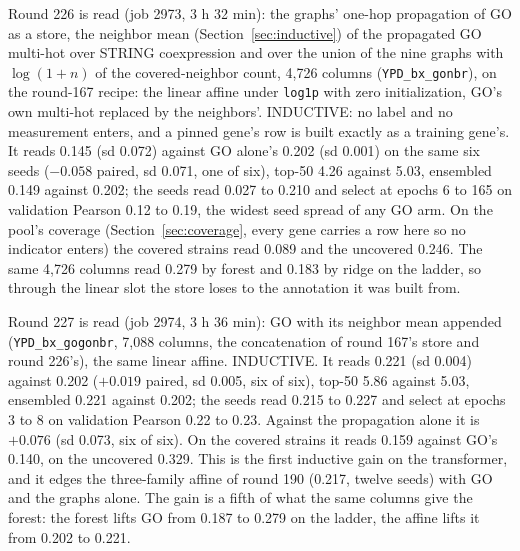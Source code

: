 Round 226 is read (job 2973, 3 h 32 min): the graphs' one-hop propagation of GO as a
store, the neighbor mean (Section~\ref{sec:inductive}) of the propagated GO multi-hot
over STRING coexpression and over the union of the nine graphs with $\log(1+n)$ of the
covered-neighbor count, 4,726 columns (\texttt{YPD\_bx\_gonbr}), on the round-167
recipe: the linear affine under \texttt{log1p} with zero initialization, GO's own
multi-hot replaced by the neighbors'. INDUCTIVE: no label and no measurement enters,
and a pinned gene's row is built exactly as a training gene's. It reads 0.145 (sd
0.072) against GO alone's 0.202 (sd 0.001) on the same six seeds ($-0.058$ paired, sd
0.071, one of six), top-50 4.26 against 5.03, ensembled 0.149 against 0.202; the seeds
read 0.027 to 0.210 and select at epochs 6 to 165 on validation Pearson 0.12 to 0.19,
the widest seed spread of any GO arm. On the pool's coverage (Section~\ref{sec:coverage},
every gene carries a row here so no indicator enters) the covered strains read 0.089
and the uncovered 0.246. The same 4,726 columns read 0.279 by forest and 0.183 by ridge
on the ladder, so through the linear slot the store loses to the annotation it was
built from.

Round 227 is read (job 2974, 3 h 36 min): GO with its neighbor mean appended
(\texttt{YPD\_bx\_gogonbr}, 7,088 columns, the concatenation of round 167's store and
round 226's), the same linear affine. INDUCTIVE. It reads 0.221 (sd 0.004) against
0.202 ($+0.019$ paired, sd 0.005, six of six), top-50 5.86 against 5.03, ensembled 0.221
against 0.202; the seeds read 0.215 to 0.227 and select at epochs 3 to 8 on validation
Pearson 0.22 to 0.23. Against the propagation alone it is $+0.076$ (sd 0.073, six of
six). On the covered strains it reads 0.159 against GO's 0.140, on the uncovered 0.329.
This is the first inductive gain on the transformer, and it edges the three-family
affine of round 190 (0.217, twelve seeds) with GO and the graphs alone. The gain is a
fifth of what the same columns give the forest: the forest lifts GO from 0.187 to 0.279
on the ladder, the affine lifts it from 0.202 to 0.221.

